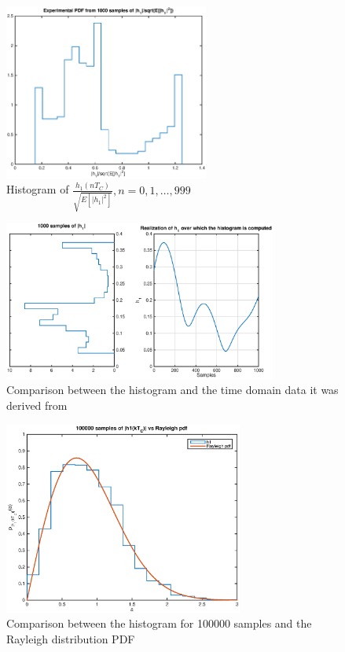 \documentclass[10pt]{article}
\begin{document}
\begin{figure}[h!]
  \centering
  \includegraphics[width = 0.6\textwidth]{p01_h1hist}
  \caption{Histogram of $\frac{h_1(nT_C)}{\sqrt{E[|h_1|^2]}}, n = 0, 1, \dots, 999$}
  \label{fig:h1hist}
\end{figure}

\begin{figure}[h!]
  \centering
  \includegraphics[width = 0.8\textwidth]{p02_h1hist}
  \caption{Comparison between the histogram and the time domain data it was derived from}
  \label{fig:h1histvstime}
\end{figure}

\begin{figure}[h!]
  \centering
  \includegraphics[width = 0.7\textwidth]{p04_h1hist}
  \caption{Comparison between the histogram for 100000 samples and the Rayleigh distribution PDF}
  \label{fig:h1hist100000}
\end{figure}
\end{document}
